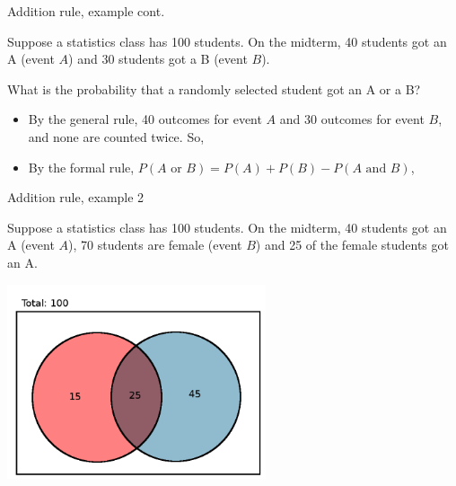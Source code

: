 \documentclass[xcolor=table, aspectratio=169, bigger]{beamer}
\begin{document}
\begin{frame}{Addition rule, example cont.}
\begin{block}{}
Suppose a statistics class has 100 students. On the midterm, 40 students got an A (event $A$) and 30 students got a B (event $B$).
\end{block}

\begin{exampleblock}{}
What is the probability that a randomly selected student got an A or a B?
\begin{itemize}
\pause
\item By the general rule, 40 outcomes for event $A$ and 30 outcomes for event $B$, and none are counted twice. So,\\
\smallskip{}
\pause
\item By the formal rule, $P(A \text{ or } B) = P(A) + P(B) - P(A \text{ and } B)$,\\
\smallskip{}
\smallskip{}
\end{itemize}
\end{exampleblock}
\end{frame}

\begin{frame}{Addition rule, example 2}
\begin{block}{}
Suppose a statistics class has 100 students. On the midterm, 40 students got an A (event $A$),  70 students are female (event $B$) and 25 of the female students got an A.
\end{block}

{\centering
\includegraphics[width=3in]{../images/ch4_venn_ovr_ex}\par
}
\end{frame}
\end{document}
